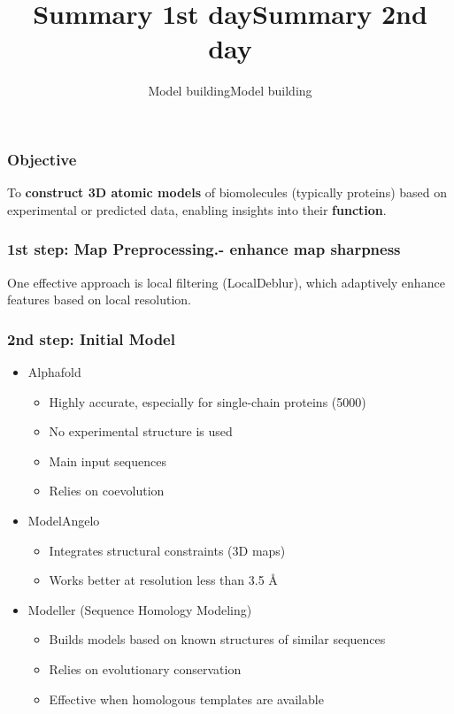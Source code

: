 \documentclass{beamer}
\title{Summary 1st day}
\subtitle{Model building}
\date{}
\begin{document}
\frame{\titlepage}

\begin{frame}
\LARGE
\frametitle{Objective}

To \textbf{construct 3D atomic models} of biomolecules (typically proteins) based on experimental or predicted data, enabling insights into their \textbf{function}.

\end{frame}


\begin{frame}
\LARGE
\frametitle{1st step: Map Preprocessing.-  enhance map sharpness}

One effective approach is local filtering (LocalDeblur), which adaptively enhance features based on local resolution.

\end{frame}

\begin{frame}
\LARGE
\frametitle{2nd step: Initial Model}
\begin{itemize}
 \item Alphafold
    \begin{itemize}
    \item Highly accurate, especially for single-chain proteins (5000)
    \item No experimental structure is used
    \item Main input sequences
    \item Relies on coevolution
    \end{itemize}
 \item ModelAngelo
    \begin{itemize}
    \item Integrates structural constraints (3D maps)
    \item Works better at resolution less than 3.5 \AA
    \end{itemize}
 \item  Modeller (Sequence Homology Modeling)
    \begin{itemize}
    \item Builds models based on known structures of similar sequences
    \item Relies on evolutionary conservation
    \item Effective when homologous templates are available
    \end{itemize}
\end{itemize}
\end{frame}


\LARGE
\title{Summary 2nd day}
\subtitle{Model building}
\frame{\titlepage}
\end{document}

